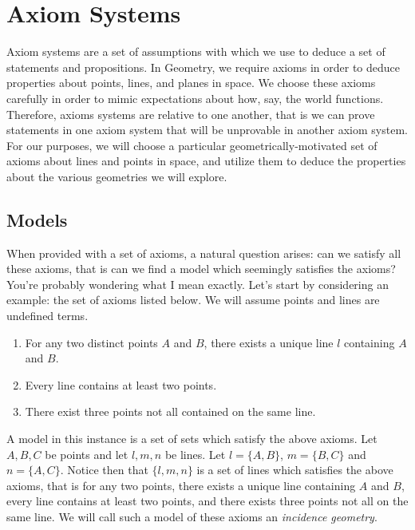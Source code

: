 \documentclass[12pt]{book}
\begin{document}
\vfill
\pagebreak

\chapter{Axiom Systems}
Axiom systems are a set of assumptions with which we use to deduce a set of statements and propositions. In Geometry, we require axioms in order to deduce properties about points, lines, and planes in space. We choose these axioms carefully in order to mimic expectations about how, say, the world functions. Therefore, axioms systems are relative to one another, that is we can prove statements in one axiom system that will be unprovable in another axiom system. For our purposes, we will choose a particular geometrically-motivated set of axioms about lines and points in space, and utilize them to deduce the properties about the various geometries we will explore.

\section{Models}
When provided with a set of axioms, a natural question arises: can we satisfy all these axioms, that is can we find a model which seemingly satisfies the axioms? You're probably wondering what I mean exactly. Let's start by considering an example: the set of axioms listed below. We will assume points and lines are undefined terms.\\

\begin{enumerate}[nolistsep, label=(\roman*)]
\item For any two distinct points $A$ and $B$, there exists a unique line $l$ containing $A$ and $B$.
\item Every line contains at least two points.
\item There exist three points not all contained on the same line.\\
\end{enumerate}

A model in this instance is a set of sets which satisfy the above axioms. Let $A,B,C$ be points and let $l,m,n$ be lines. Let $l=\{A,B\}$, $m=\{B,C\}$ and $n=\{A,C\}$. Notice then that $\{l,m,n\}$ is a set of lines which satisfies the above axioms, that is for any two points, there exists a unique line containing $A$ and $B$, every line contains at least two points, and there exists three points not all on the same line. We will call such a model of these axioms an \textit{incidence geometry}.  
\end{document}
